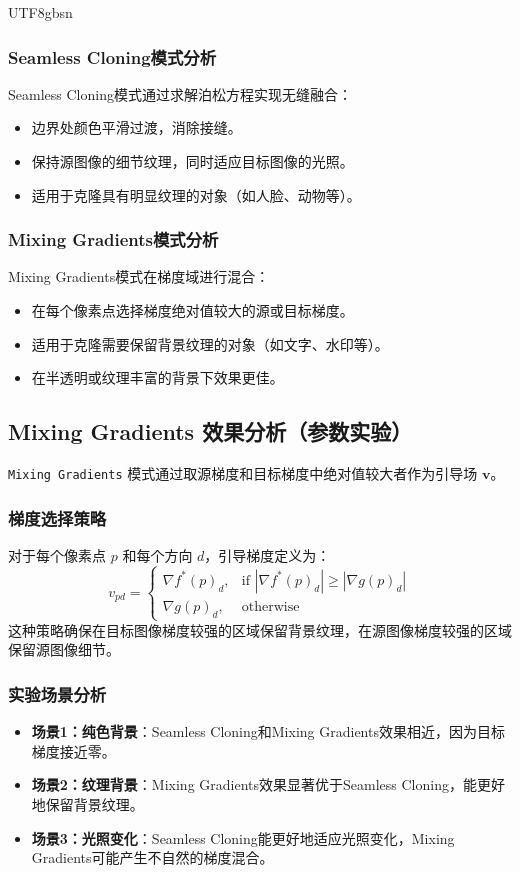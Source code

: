 \documentclass[11pt,a4paper]{article}
\begin{document}
\begin{CJK*}{UTF8}{gbsn}
\subsubsection{Seamless Cloning模式分析}
Seamless Cloning模式通过求解泊松方程实现无缝融合：
\begin{itemize}
    \item 边界处颜色平滑过渡，消除接缝。
    \item 保持源图像的细节纹理，同时适应目标图像的光照。
    \item 适用于克隆具有明显纹理的对象（如人脸、动物等）。
\end{itemize}

\subsubsection{Mixing Gradients模式分析}
Mixing Gradients模式在梯度域进行混合：
\begin{itemize}
    \item 在每个像素点选择梯度绝对值较大的源或目标梯度。
    \item 适用于克隆需要保留背景纹理的对象（如文字、水印等）。
    \item 在半透明或纹理丰富的背景下效果更佳。
\end{itemize}

\subsection{Mixing Gradients 效果分析（参数实验）}
\texttt{Mixing Gradients} 模式通过取源梯度和目标梯度中绝对值较大者作为引导场 $\mathbf{v}$。

\subsubsection{梯度选择策略}
对于每个像素点 $p$ 和每个方向 $d$，引导梯度定义为：
\begin{equation}
    v_{pd} = \begin{cases} \nabla f^*(p)_d, & \text{if } |\nabla f^*(p)_d| \geq |\nabla g(p)_d| \\ \nabla g(p)_d, & \text{otherwise} \end{cases}
\end{equation}
这种策略确保在目标图像梯度较强的区域保留背景纹理，在源图像梯度较强的区域保留源图像细节。

\subsubsection{实验场景分析}
\begin{itemize}
    \item \textbf{场景1：纯色背景}：Seamless Cloning和Mixing Gradients效果相近，因为目标梯度接近零。
    \item \textbf{场景2：纹理背景}：Mixing Gradients效果显著优于Seamless Cloning，能更好地保留背景纹理。
    \item \textbf{场景3：光照变化}：Seamless Cloning能更好地适应光照变化，Mixing Gradients可能产生不自然的梯度混合。
\end{itemize}


\end{CJK*}
\end{document}
